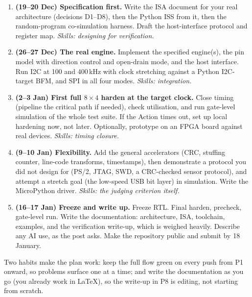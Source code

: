\begin{enumerate}[label=\textbf{P\arabic*}]
  \item \textbf{(19--20 Dec) Specification first.} Write the ISA document
    for your real architecture (decisions D1--D8), then the Python ISS from
    it, then the random-program co-simulation harness. Draft the
    host-interface protocol and register map. \emph{Skills: designing for
    verification.}
  \item \textbf{(26--27 Dec) The real engine.} Implement the specified
    engine(s), the pin model with direction control and open-drain mode, and
    the host interface. Run I2C at 100 and 400\,kHz with clock stretching
    against a Python I2C-target BFM, and SPI in all four modes.
    \emph{Skills: integration.}
  \item \textbf{(2--3 Jan) First full $8\times4$ harden at the target
    clock.} Close timing (pipeline the critical path if needed), check
    utilisation, and run gate-level simulation of the whole test suite. If
    the Action times out, set up local hardening now, not later. Optionally,
    prototype on an FPGA board against real devices. \emph{Skills: timing
    closure.}
  \item \textbf{(9--10 Jan) Flexibility.} Add the general accelerators (CRC,
    stuffing counter, line-code transforms, timestamps), then demonstrate a
    protocol you did not design for (PS/2, JTAG, SWD, a CRC-checked sensor
    protocol), and attempt a stretch goal (the low-speed USB bit layer) in
    simulation. Write the MicroPython driver. \emph{Skills: the judging
    criterion itself.}
  \item \textbf{(16--17 Jan) Freeze and write up.} Freeze RTL. Final harden,
    precheck, gate-level run. Write the documentation: architecture, ISA,
    toolchain, examples, and the verification write-up, which is weighed
    heavily. Describe any AI use, as the post asks. Make the repository
    public and submit by 18 January.
\end{enumerate}
Two habits make the plan work: keep the full flow green on every push from
P1 onward, so problems surface one at a time; and write the documentation as
you go (you already work in \LaTeX), so the write-up in P8 is editing,
not starting from scratch.

